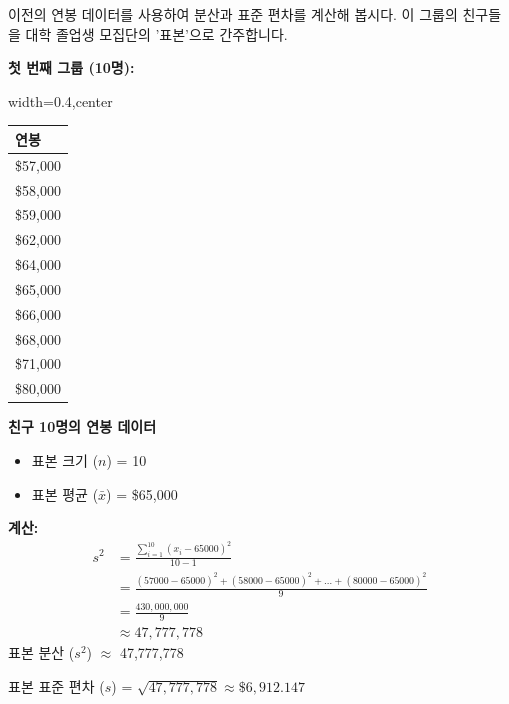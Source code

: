 \documentclass[11pt,a4paper]{book}
\providecommand{\captionof}[2]{\textbf{#2}}
\theoremstyle{definition}
\begin{document}
\begin{examplebox}[title=예시: 연봉 데이터로 분산 및 표준 편차 계산]
이전의 연봉 데이터를 사용하여 분산과 표준 편차를 계산해 봅시다. 이 그룹의 친구들을 대학 졸업생 모집단의 '표본'으로 간주합니다.

\textbf{첫 번째 그룹 (10명):}
\begin{adjustbox}{width=0.4\textwidth,center}
\begin{tabular}{l}
\toprule
\textbf{연봉} \\
\midrule
\$57,000 \\
\$58,000 \\
\$59,000 \\
\$62,000 \\
\$64,000 \\
\$65,000 \\
\$66,000 \\
\$68,000 \\
\$71,000 \\
\$80,000 \\
\bottomrule
\end{tabular}
\end{adjustbox}
\captionof{table}{친구 10명의 연봉 데이터}
\label{tab:salary_example1_sd}
\begin{itemize}
    \item 표본 크기 ($n$) = 10
    \item 표본 평균 ($\bar{x}$) = \$65,000
\end{itemize}
\textbf{계산:}
\begin{align*}
    s^2 &= \frac{\sum_{i=1}^{10} (x_i - 65000)^2}{10-1} \\
    &= \frac{(57000-65000)^2 + (58000-65000)^2 + \dots + (80000-65000)^2}{9} \\
    &= \frac{430,000,000}{9} \\
    &\approx 47,777,778
\end{align*}
표본 분산 ($s^2$) $\approx$ 47,777,778

표본 표준 편차 ($s$) = $\sqrt{47,777,778} \approx \$6,912.147$


\end{examplebox}
\end{document}
